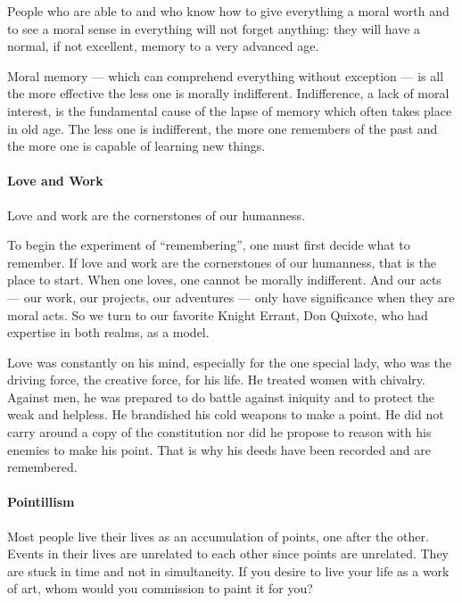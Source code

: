 \begin{quotex}
People who are able to and who know how to give everything a moral worth and to see a moral sense in everything will not forget anything: they will have a normal, if not excellent, memory to a very advanced age.

Moral memory — which can comprehend everything without exception — is all the more effective the less one is morally indifferent. Indifference, a lack of moral interest, is the fundamental cause of the lapse of memory which often takes place in old age. The less one is indifferent, the more one remembers of the past and the more one is capable of learning new things. 

\end{quotex}
\paragraph{Love and Work}
\begin{quotex}
Love and work are the cornerstones of our humanness. 

\end{quotex}
To begin the experiment of “remembering”, one must first decide what to remember. If love and work are the cornerstones of our humanness, that is the place to start. When one loves, one cannot be morally indifferent. And our acts — our work, our projects, our adventures — only have significance when they are moral acts. So we turn to our favorite Knight Errant, Don Quixote, who had expertise in both realms, as a model.

Love was constantly on his mind, especially for the one special lady, who was the driving force, the creative force, for his life. He treated women with chivalry. Against men, he was prepared to do battle against iniquity and to protect the weak and helpless. He brandished his cold weapons to make a point. He did not carry around a copy of the constitution nor did he propose to reason with his enemies to make his point. That is why his deeds have been recorded and are remembered.

\paragraph{Pointillism}
Most people live their lives as an accumulation of points, one after the other. Events in their lives are unrelated to each other since points are unrelated. They are stuck in time and not in simultaneity. If you desire to live your life as a work of art, whom would you commission to paint it for you?

